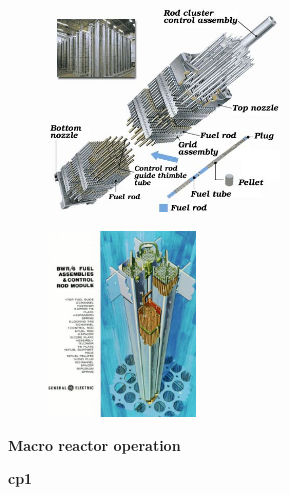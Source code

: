 \documentclass[aspectratio=1610,pdftex,dvipsnames,compress,xcolor={dvipsnames}]{beamer}
\newcommand{\acf}{\acrfull} %
\begin{document}
\begin{frame}{}
    \begin{figure}
        \centering
        \includegraphics[width=0.55\textwidth]{pwr.jpg}
    \end{figure}
\end{frame}


\begin{frame}{}
    \begin{figure}
        \centering
        \includegraphics[width=0.35\textwidth]{bwr.jpg}
    \end{figure}
\end{frame}


\begin{frame}[plain]{}
    \centering\LARGE\textbf{Macro reactor operation}
\end{frame}


\begin{frame}[plain]{}
    \centering\LARGE\textbf{\acf{cp1}}
\end{frame}
\end{document}
